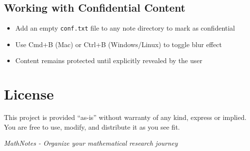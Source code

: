\documentclass{article}
\begin{document}
\subsection{Working with Confidential Content}
\begin{itemize}
  \item Add an empty \texttt{conf.txt} file to any note directory to mark as confidential
  \item Use Cmd+B (Mac) or Ctrl+B (Windows/Linux) to toggle blur effect
  \item Content remains protected until explicitly revealed by the user
\end{itemize}

\section{License}

This project is provided ``as-is'' without warranty of any kind, express or implied. You are free to use, modify, and distribute it as you see fit.

\vspace{1cm}
\hrulefill

\begin{center}
\textit{MathNotes - Organize your mathematical research journey}
\end{center}
\end{document}
